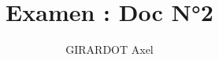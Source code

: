 \documentclass[10pt,twocolumn,letterpaper]{article}
\begin{document}
\nocite{*}

\title{Examen : Doc N°2}
\author{GIRARDOT Axel}
\maketitle




{\small


}
\end{document}
